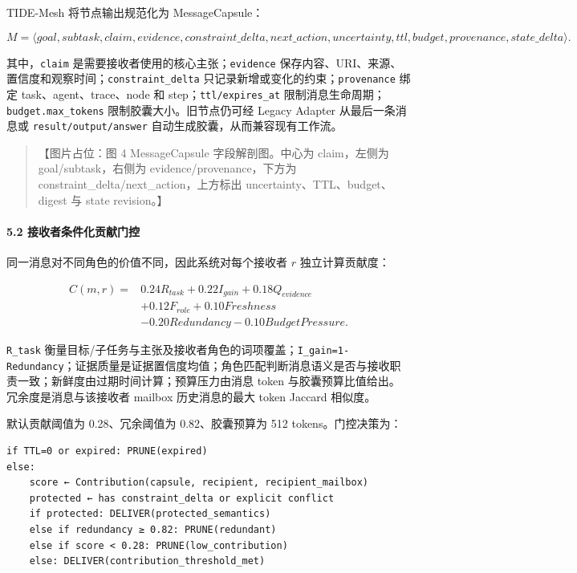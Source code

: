 \documentclass[UTF8,a4paper,12pt]{ctexart}
\begin{document}
TIDE-Mesh 将节点输出规范化为 MessageCapsule：

\[
M=\langle goal,subtask,claim,evidence,constraint\_delta,next\_action,
uncertainty,ttl,budget,provenance,state\_delta\rangle.
\]

其中，\texttt{claim} 是需要接收者使用的核心主张；\texttt{evidence} 保存内容、URI、来源、置信度和观察时间；\texttt{constraint\_delta} 只记录新增或变化的约束；\texttt{provenance} 绑定 task、agent、trace、node 和 step；\texttt{ttl/expires\_at} 限制消息生命周期；\texttt{budget.max\_tokens} 限制胶囊大小。旧节点仍可经 Legacy Adapter 从最后一条消息或 \texttt{result/output/answer} 自动生成胶囊，从而兼容现有工作流。

\begin{quote}
【图片占位：图 4 MessageCapsule 字段解剖图。中心为 claim，左侧为 goal/subtask，右侧为 evidence/provenance，下方为 constraint\_delta/next\_action，上方标出 uncertainty、TTL、budget、digest 与 state revision。】
\end{quote}

\paragraph{5.2 接收者条件化贡献门控}

同一消息对不同角色的价值不同，因此系统对每个接收者 \(r\) 独立计算贡献度：

\[
\begin{aligned}
C(m,r)= {}&0.24R_{task}+0.22I_{gain}+0.18Q_{evidence}\\
&+0.12F_{role}+0.10Freshness\\
&-0.20Redundancy-0.10BudgetPressure.
\end{aligned}
\]

\texttt{R\_task} 衡量目标/子任务与主张及接收者角色的词项覆盖；\texttt{I\_gain=1-Redundancy}；证据质量是证据置信度均值；角色匹配判断消息语义是否与接收职责一致；新鲜度由过期时间计算；预算压力由消息 token 与胶囊预算比值给出。冗余度是消息与该接收者 mailbox 历史消息的最大 token Jaccard 相似度。

默认贡献阈值为 0.28、冗余阈值为 0.82、胶囊预算为 512 tokens。门控决策为：

\begin{verbatim}
if TTL=0 or expired: PRUNE(expired)
else:
    score ← Contribution(capsule, recipient, recipient_mailbox)
    protected ← has constraint_delta or explicit conflict
    if protected: DELIVER(protected_semantics)
    else if redundancy ≥ 0.82: PRUNE(redundant)
    else if score < 0.28: PRUNE(low_contribution)
    else: DELIVER(contribution_threshold_met)
\end{verbatim}
\end{document}
